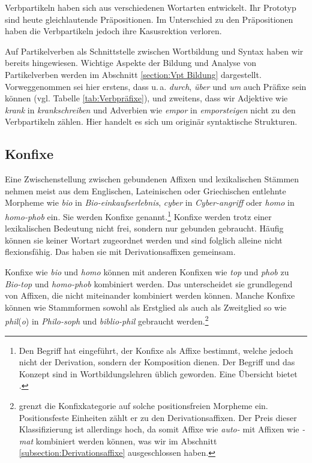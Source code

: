 Verbpartikeln haben sich aus verschiedenen Wortarten entwickelt. Ihr Prototyp sind heute gleichlautende Präpositionen. Im Unterschied zu den Präpositionen haben die Verbpartikeln jedoch ihre Kasusrektion verloren.

Auf Partikelverben als Schnittstelle zwischen Wortbildung und Syntax haben wir bereits hingewiesen. Wichtige Aspekte der Bildung und Analyse von Partikelverben werden im Abschnitt \ref{section:Vpt Bildung} dargestellt. Vorweggenommen sei hier erstens, dass u.\,a. \textit{durch}, \textit{über} und \textit{um} auch Präfixe sein können (vgl. Tabelle \ref{tab:Verbpräfixe}), und zweitens, dass wir Adjektive wie \textit{krank} in \textit{krankschreiben} und Adverbien wie \textit{empor} in \textit{emporsteigen} nicht zu den Verbpartikeln zählen. Hier handelt es sich um originär syntaktische Strukturen. 



\subsection{Konfixe}\label{subsection:Konfixe}
    
Eine Zwischenstellung zwischen gebundenen Affixen und lexikalischen Stämmen nehmen meist aus dem Englischen, Lateinischen oder Griechischen entlehnte Morpheme wie \textit{bio} in \textit{Bio-einkaufserlebnis}, \textit{cyber} in \textit{Cyber-angriff} oder \textit{homo} in \textit{homo-phob} ein. Sie werden Konfixe genannt.\footnote{Den Begriff hat \citet[49]{Schmidt1987} eingeführt, der Konfixe als Affixe bestimmt, welche jedoch nicht der Derivation, sondern der Komposition dienen. Der Begriff und das Konzept sind in Wortbildungslehren üblich geworden. Eine Übersicht bietet \citet{Donalies2009Konfix}.} Konfixe werden trotz einer lexikalischen Bedeutung nicht frei, sondern nur gebunden gebraucht. Häufig können sie keiner Wortart zugeordnet werden und sind folglich alleine nicht flexionsfähig. Das haben sie mit Derivationsaffixen gemeinsam.

Konfixe wie \textit{bio} und \textit{homo} können mit anderen Konfixen wie \textit{top} und \textit{phob} zu \textit{Bio-top} und \textit{homo-phob} kombiniert werden. Das unterscheidet sie grundlegend von Affixen, die nicht miteinander kombiniert werden können. Manche Konfixe können wie Stammformen sowohl als Erstglied als auch als Zweitglied so wie \textit{phil}(\textit{o}) in \textit{Philo-soph} und \textit{biblio-phil} gebraucht werden.\footnote{\citet[125]{MüllerPO2000} grenzt die Konfixkategorie auf solche positionsfreien Morpheme ein. Positionsfeste Einheiten zählt er zu den Derivationsaffixen. Der Preis dieser Klassifizierung ist allerdings hoch, da somit Affixe wie \textit{auto-} mit Affixen wie \textit{-mat} kombiniert werden können, was wir im Abschnitt \ref{subsection:Derivationsaffixe} ausgeschlossen haben.}


